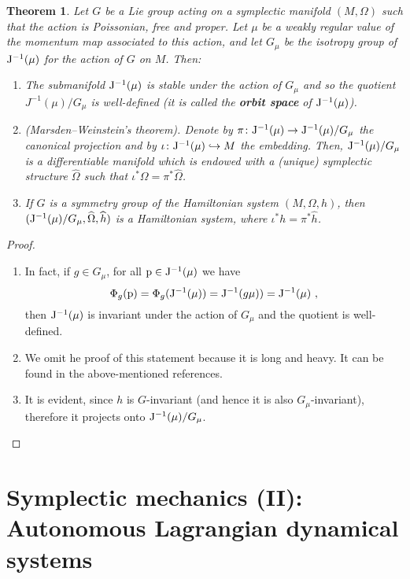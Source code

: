 \documentclass[12pt]{report}
\newtheorem{teor}{Theorem}[chapter]
\def\qed{\ifvmode\removelastskip\fi
{\unskip\nobreak\hfil\penalty50\hbox{}\nobreak\hfil
\hbox{\vrule height1.2ex width1.2ex}\parfillskip=0pt
\finalhyphendemerits=0 \par\smallskip}}
\begin{document}
\begin{teor}
Let $G$ be a Lie group acting on a symplectic manifold 
$(M,\Omega )$ such that the action is 
Poissonian, free and proper.
Let $\mu$ be a weakly regular value of the
momentum map associated to this action,
and let $G_{\mu}$ be the isotropy group of
${\rm J}^{-1}(\mu )$ for the action of $G$ on $M$.
Then:
\begin{enumerate}
\item
The submanifold 
${\rm J}^{-1}(\mu )$ is stable under the action of $G_\mu$ and
so the quotient $J^{-1}(\mu )/G_\mu$ is well-defined
(it is called the
\textbf{orbit space} of ${\rm J}^{-1}(\mu )$).
\item
{\rm (Marsden--Weinstein's theorem)}.
Denote by $\pi \colon{\rm J}^{-1}(\mu ) \to{\rm J}^{-1}(\mu )/G_\mu$
the canonical projection and by
$\iota \colon{\rm J}^{-1}(\mu ) \hookrightarrow M$ the embedding.
Then, ${\rm J}^{-1}(\mu )/G_\mu$ is a differentiable manifold
which is endowed with a (unique) symplectic structure
$\widehat\Omega$ such that
$\iota^*\Omega = \pi^*\widehat\Omega$.
\item
If $G$ is a symmetry group of the
Hamiltonian system $(M,\Omega ,h)$,
then $({\rm J}^{-1}(\mu )/G_\mu ,\widehat\Omega ,\widehat h)$
is a Hamiltonian system, where
$\iota^*h = \pi^*\widehat h$.
\end{enumerate}
\end{teor}
\begin{proof}
\begin{enumerate}
\item
In fact, if $g \in G_{\mu}$, for all ${\rm p}\in{\rm J}^{-1}(\mu )$ we have
$$
\Phi_g({\rm p}) = \Phi_g({\rm J}^{-1}(\mu)) =
{\rm J}^{-1}(g\mu )) = {\rm J}^{-1}(\mu ) \ ,
$$
then ${\rm J}^{-1}(\mu )$ is invariant under the action of $G_{\mu}$
and the quotient is well-defined.
\item
We omit he proof of this statement because it is long and heavy.
It can be found in the above-mentioned references.
\item
It is evident, since $h$ is $G$-invariant
(and hence it is also $G_\mu$-invariant),
therefore it projects onto 
${\rm J}^{-1}(\mu )/G_\mu$.
\end{enumerate}
\qed  \end{proof}




\chapter{Symplectic mechanics (II): Autonomous Lagrangian dynamical systems}
\protect\label{sdl}
\end{document}
